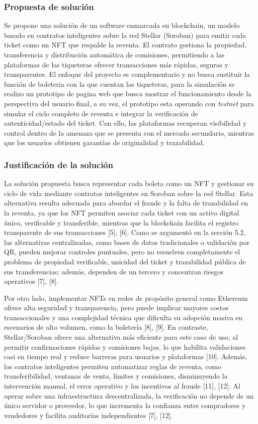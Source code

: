\documentclass[12pt,a4paper]{article}
\begin{document}
\subsubsection{Propuesta de solución}
Se propone una solución de un software enmarcada en blockchain, un modelo basado en contratos inteligentes sobre la red Stellar (Soroban) para emitir cada ticket como un NFT que respalde la reventa. El contrato gestiona la propiedad, transferencia y distribución automática de comisiones, permitiendo a las plataformas de las tiqueteras ofrecer transacciones más rápidas, seguras y transparentes. El enfoque del proyecto es complementario y no busca sustituir la función de boleteria con la que cuentan las tiqueteras, para la simulación se realizo un prototipo de pagina web que busca mostrar el funcionamiento desde la perspectiva del usuario final, a su vez, el prototipo esta operando con \textit{testnet} para simular el ciclo completo de reventa e integrar la verificación de autenticidad/estado del ticket. Con ello, las plataformas recuperan visibilidad y control dentro de la amenaza que se presenta con el mercado secundario, mientras que los usuarios obtienen garantías de originalidad y trazabilidad.

\subsubsection{Justificación de la solución}
La solución propuesta busca representar cada boleta como un NFT y gestionar su ciclo de vida mediante contratos inteligentes en Soroban sobre la red Stellar. Esta alternativa resulta adecuada para abordar el fraude y la falta de trazabilidad en la reventa, ya que los NFT permiten asociar cada ticket con un activo digital único, verificable y transferible, mientras que la blockchain facilita el registro transparente de sus transacciones [5], [6]. Como se argumentó en la sección 5.2, las alternativas centralizadas, como bases de datos tradicionales o validación por QR, pueden mejorar controles puntuales, pero no resuelven completamente el problema de propiedad verificable, unicidad del ticket y trazabilidad pública de sus transferencias; además, dependen de un tercero y concentran riesgos operativos [7], [8].

Por otro lado, implementar NFTs en redes de propósito general como Ethereum ofrece alta seguridad y transparencia, pero puede implicar mayores costos transaccionales y una complejidad técnica que dificulta su adopción masiva en escenarios de alto volumen, como la boletería [8], [9]. En contraste, Stellar/Soroban ofrece una alternativa más eficiente para este caso de uso, al permitir confirmaciones rápidas y comisiones bajas, lo que habilita validaciones casi en tiempo real y reduce barreras para usuarios y plataformas [10]. Además, los contratos inteligentes permiten automatizar reglas de reventa, como transferibilidad, ventanas de venta, límites y comisiones, disminuyendo la intervención manual, el error operativo y los incentivos al fraude [11], [12]. Al operar sobre una infraestructura descentralizada, la verificación no depende de un único servidor o proveedor, lo que incrementa la confianza entre compradores y vendedores y facilita auditorías independientes [7], [12].
\end{document}
